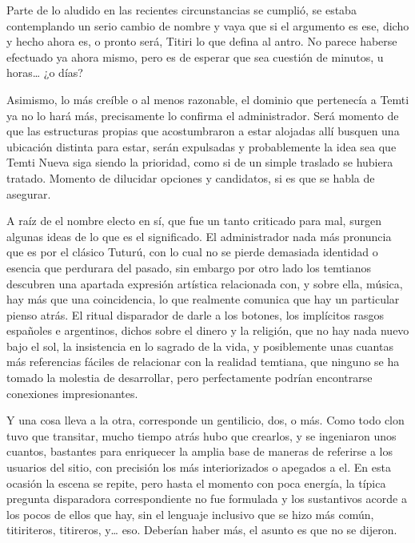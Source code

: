 \documentclass[
]{book}
\begin{document}
Parte de lo aludido en las recientes circunstancias se cumplió, se estaba contemplando un serio cambio de nombre y vaya que si el argumento es ese, dicho y hecho ahora es, o pronto será, Titiri lo que defina al antro. No parece haberse efectuado ya ahora mismo, pero es de esperar que sea cuestión de minutos, u horas\ldots{} ¿o días?

Asimismo, lo más creíble o al menos razonable, el dominio que pertenecía a Temti ya no lo hará más, precisamente lo confirma el administrador. Será momento de que las estructuras propias que acostumbraron a estar alojadas allí busquen una ubicación distinta para estar, serán expulsadas y probablemente la idea sea que Temti Nueva siga siendo la prioridad, como si de un simple traslado se hubiera tratado. Momento de dilucidar opciones y candidatos, si es que se habla de asegurar.

A raíz de el nombre electo en sí, que fue un tanto criticado para mal, surgen algunas ideas de lo que es el significado. El administrador nada más pronuncia que es por el clásico Tuturú, con lo cual no se pierde demasiada identidad o esencia que perdurara del pasado, sin embargo por otro lado los temtianos descubren una apartada expresión artística relacionada con, y sobre ella, música, hay más que una coincidencia, lo que realmente comunica que hay un particular pienso atrás. El ritual disparador de darle a los botones, los implícitos rasgos españoles e argentinos, dichos sobre el dinero y la religión, que no hay nada nuevo bajo el sol, la insistencia en lo sagrado de la vida, y posiblemente unas cuantas más referencias fáciles de relacionar con la realidad temtiana, que ninguno se ha tomado la molestia de desarrollar, pero perfectamente podrían encontrarse conexiones impresionantes.

Y una cosa lleva a la otra, corresponde un gentilicio, dos, o más. Como todo clon tuvo que transitar, mucho tiempo atrás hubo que crearlos, y se ingeniaron unos cuantos, bastantes para enriquecer la amplia base de maneras de referirse a los usuarios del sitio, con precisión los más interiorizados o apegados a el. En esta ocasión la escena se repite, pero hasta el momento con poca energía, la típica pregunta disparadora correspondiente no fue formulada y los sustantivos acorde a los pocos de ellos que hay, sin el lenguaje inclusivo que se hizo más común, titiriteros, titireros, y\ldots{} eso. Deberían haber más, el asunto es que no se dijeron.
\end{document}
